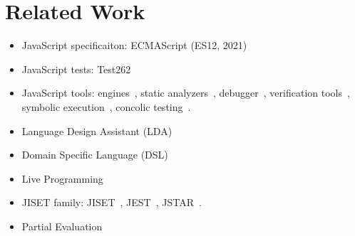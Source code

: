 \section{Related Work}\label{sec:related}

\begin{itemize}
  \item JavaScript specificaiton: ECMAScript (ES12, 2021)~\cite{es12}
  \item JavaScript tests: Test262~\cite{test262}
  \item JavaScript tools: engines~\cite{v8, jscore, chakra, spidermonkey},
    static analyzers~\cite{safe, safe2, tajs, wala, jsai},
    debugger~\cite{jsexplain}, verification tools~\cite{javert, javert2,
    ad-safety, javanni}, symbolic execution~\cite{symbolic-js, sym-js, expo-se},
    concolic testing~\cite{jalangi, type-conc-test}.
  \item Language Design Assistant (LDA)~\cite{lda, lisa, ipld, asf-sdf,
    meta-env}
  \item Domain Specific Language (DSL)~\cite{dsl-survey, dsl-survey2}
  \item Live Programming~\cite{omnicode, situ-vis, proj-box}
  \item JISET family: JISET~\cite{jiset}, JEST~\cite{jest}, JSTAR~\cite{jstar}.
  \item Partial Evaluation~\cite{peval, peval-survey}
\end{itemize}

\todo
